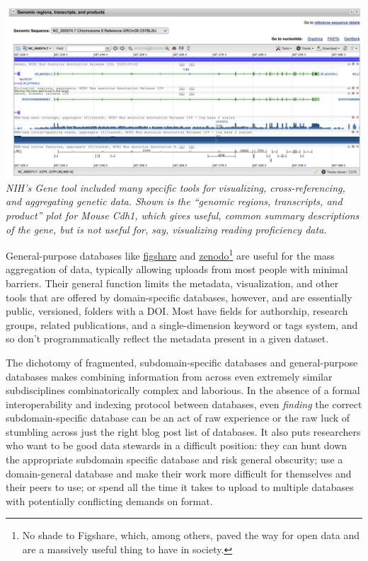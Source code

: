 \documentclass[10pt]{tufte-book}
\begin{document}
\includegraphics[width=\linewidth]{../assets/images/nih_gene_cdh1.png}
\emph{NIH's Gene tool included many specific tools for visualizing,
cross-referencing, and aggregating genetic data. Shown is the ``genomic
regions, transcripts, and product'' plot for Mouse Cdh1, which gives
useful, common summary descriptions of the gene, but is not useful for,
say, visualizing reading proficiency data.}

General-purpose databases like \href{https://figshare.com/}{figshare}
and \href{https://zenodo.org/}{zenodo}\footnote{No shade to Figshare,
  which, among others, paved the way for open data and are a massively
  useful thing to have in society.} are useful for the mass aggregation
of data, typically allowing uploads from most people with minimal
barriers. Their general function limits the metadata, visualization, and
other tools that are offered by domain-specific databases, however, and
are essentially public, versioned, folders with a DOI. Most have fields
for authorship, research groups, related publications, and a
single-dimension keyword or tags system, and so don't programmatically
reflect the metadata present in a given dataset.

The dichotomy of fragmented, subdomain-specific databases and
general-purpose databases makes combining information from across even
extremely similar subdisciplines combinatorically complex and laborious.
In the absence of a formal interoperability and indexing protocol
between databases, even \emph{finding} the correct subdomain-specific
database can be an act of raw experience or the raw luck of stumbling
across just the right blog post list of databases. It also puts
researchers who want to be good data stewards in a difficult position:
they can hunt down the appropriate subdomain specific database and risk
general obscurity; use a domain-general database and make their work
more difficult for themselves and their peers to use; or spend all the
time it takes to upload to multiple databases with potentially
conflicting demands on format.
\end{document}
